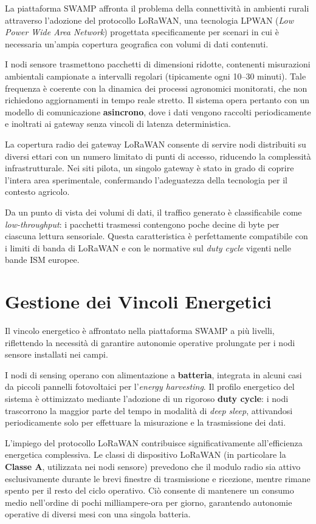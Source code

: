 La piattaforma SWAMP affronta il problema della connettività in ambienti rurali attraverso l'adozione del protocollo LoRaWAN, una tecnologia LPWAN (\textit{Low Power Wide Area Network}) progettata specificamente per scenari in cui è necessaria un'ampia copertura geografica con volumi di dati contenuti.

I nodi sensore trasmettono pacchetti di dimensioni ridotte, contenenti misurazioni ambientali campionate a intervalli regolari (tipicamente ogni 10--30 minuti). Tale frequenza è coerente con la dinamica dei processi agronomici monitorati, che non richiedono aggiornamenti in tempo reale stretto. Il sistema opera pertanto con un modello di comunicazione \textbf{asincrono}, dove i dati vengono raccolti periodicamente e inoltrati ai gateway senza vincoli di latenza deterministica.

La copertura radio dei gateway LoRaWAN consente di servire nodi distribuiti su diversi ettari con un numero limitato di punti di accesso, riducendo la complessità infrastrutturale. Nei siti pilota, un singolo gateway è stato in grado di coprire l'intera area sperimentale, confermando l'adeguatezza della tecnologia per il contesto agricolo.

Da un punto di vista dei volumi di dati, il traffico generato è classificabile come \textit{low-throughput}: i pacchetti trasmessi contengono poche decine di byte per ciascuna lettura sensoriale. Questa caratteristica è perfettamente compatibile con i limiti di banda di LoRaWAN e con le normative sul \textit{duty cycle} vigenti nelle bande ISM europee.


\section{Gestione dei Vincoli Energetici}

Il vincolo energetico è affrontato nella piattaforma SWAMP a più livelli, riflettendo la necessità di garantire autonomie operative prolungate per i nodi sensore installati nei campi.

I nodi di sensing operano con alimentazione a \textbf{batteria}, integrata in alcuni casi da piccoli pannelli fotovoltaici per l'\textit{energy harvesting}. Il profilo energetico del sistema è ottimizzato mediante l'adozione di un rigoroso \textbf{duty cycle}: i nodi trascorrono la maggior parte del tempo in modalità di \textit{deep sleep}, attivandosi periodicamente solo per effettuare la misurazione e la trasmissione dei dati.

L'impiego del protocollo LoRaWAN contribuisce significativamente all'efficienza energetica complessiva. Le classi di dispositivo LoRaWAN (in particolare la \textbf{Classe A}, utilizzata nei nodi sensore) prevedono che il modulo radio sia attivo esclusivamente durante le brevi finestre di trasmissione e ricezione, mentre rimane spento per il resto del ciclo operativo. Ciò consente di mantenere un consumo medio nell'ordine di pochi milliampere-ora per giorno, garantendo autonomie operative di diversi mesi con una singola batteria.

